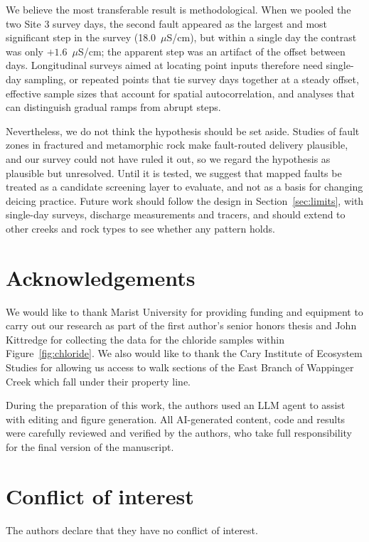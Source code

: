 \documentclass{article}
\begin{document}
We believe the most transferable result is methodological. When we pooled the two Site 3 survey days, the second fault appeared as the largest and most significant step in the survey (18.0~$\mu$S/cm), but within a single day the contrast was only $+1.6$~$\mu$S/cm; the apparent step was an artifact of the offset between days. Longitudinal surveys aimed at locating point inputs therefore need single-day sampling, or repeated points that tie survey days together at a steady offset, effective sample sizes that account for spatial autocorrelation, and analyses that can distinguish gradual ramps from abrupt steps.

Nevertheless, we do not think the hypothesis should be set aside. Studies of fault zones in fractured and metamorphic rock make fault-routed delivery plausible, and our survey could not have ruled it out, so we regard the hypothesis as plausible but unresolved. Until it is tested, we suggest that mapped faults be treated as a candidate screening layer to evaluate, and not as a basis for changing deicing practice. Future work should follow the design in Section~\ref{sec:limits}, with single-day surveys, discharge measurements and tracers, and should extend to other creeks and rock types to see whether any pattern holds.


\section*{Acknowledgements}

We would like to thank Marist University for providing funding and equipment to carry out our research as part of the first author's senior honors thesis and John Kittredge for collecting the data for the chloride samples within Figure~\ref{fig:chloride}. We also would like to thank the Cary Institute of Ecosystem Studies for allowing us access to walk sections of the East Branch of Wappinger Creek which fall under their property line.

During the preparation of this work, the authors used an LLM agent to assist with editing and figure generation. All AI-generated content, code and results were carefully reviewed and verified by the authors, who take full responsibility for the final version of the manuscript.

\section*{Conflict of interest}

The authors declare that they have no conflict of interest.
\end{document}
